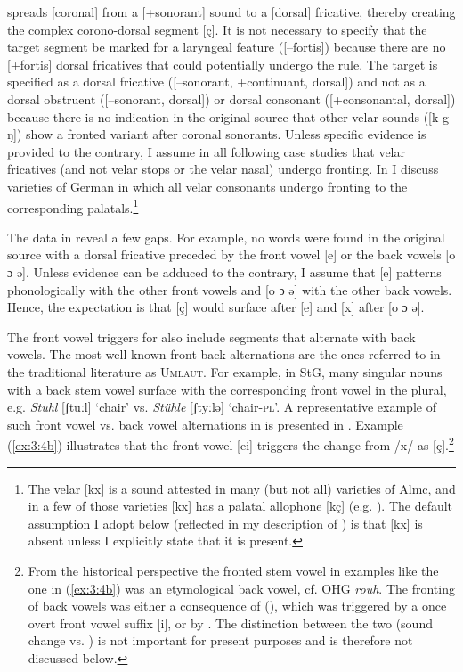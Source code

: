  spreads [coronal] from a [+sonorant] sound to a [dorsal] fricative, thereby creating the complex corono-dorsal segment [ç]. It is not necessary to specify that the target segment be marked for a laryngeal feature ([{}--fortis]) because there are no [+fortis] dorsal fricatives that could potentially undergo the rule. The target is specified as a dorsal fricative ([{}--sonorant, +continuant, dorsal]) and not as a dorsal obstruent ([{}--sonorant, dorsal]) or dorsal consonant ([+consonantal, dorsal]) because there is no indication in the original source that other velar sounds ([k g ŋ]) show a fronted variant after coronal sonorants. Unless specific evidence is provided to the contrary, I assume in all following case studies that velar fricatives (and not velar stops or the velar nasal) undergo fronting. In  I discuss varieties of German in which all velar consonants undergo fronting to the corresponding palatals.\footnote{{The velar  [kx] is a sound attested in many (but not all) varieties of Almc, and in a few of those varieties [kx] has a palatal allophone [kç] (e.g. ). The default assumption I adopt below (reflected in my description of ) is that [kx] is absent unless I explicitly state that it is present.} }

The data in  reveal a few gaps. For example, no words were found in the original source with a dorsal fricative preceded by the front vowel [e] or the back vowels [o ɔ ə]. Unless evidence can be adduced to the contrary, I assume that [e] patterns phonologically with the other front vowels and [o ɔ ə] with the other back vowels. Hence, the expectation is that [ç] would surface after [e] and [x] after [o ɔ ə].

The front vowel triggers for  also include segments that alternate with back vowels. The most well-known front-back alternations are the ones referred to in the traditional literature as \textsc{Umlaut}. For example, in StG, many singular nouns with a back stem vowel surface with the corresponding front vowel in the plural, e.g. \textit{Stuhl} [ʃtuːl] ‘chair’ vs. \textit{Stühle} [ʃtyːlə] ‘chair-\textsc{pl}’. A representative example of such front vowel vs. back vowel alternations in  is presented in . Example (\ref{ex:3:4b}) illustrates that the front vowel [ei] triggers the change from /x/ as [ç].\footnote{{From the historical perspective the fronted stem vowel in examples like the one in (\ref{ex:3:4b}) was an etymological back vowel, cf. OHG} {\textit{rouh}}{. The fronting of back vowels was either a consequence of  (), which was triggered by a once overt front vowel suffix [i], or by . The distinction between the two (sound change vs. ) is not important for present purposes and is therefore not discussed below.}}

